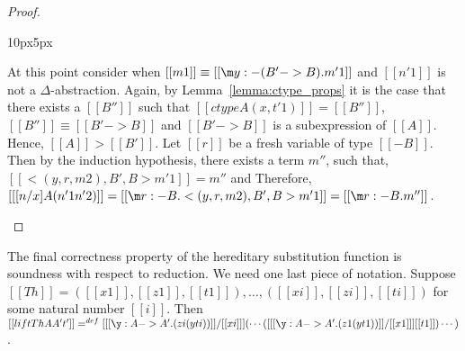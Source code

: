 \begin{proof}
\begin{changemargin}{10px}{5px}
\begin{itemize}
    At this point consider when $[[m1]] \equiv [[\m y:{-(B'->B)}.m'1]]$ and $[[n'1]]$ is not a 
    $\Delta$-abstraction.  Again, by Lemma~\ref{lemma:ctype_props} it is the case that 
    there exists a $[[B'']]$ such that $[[ctype A (x,t'1)]] = [[B'']]$, $[[B'']] \equiv [[B' -> B]]$ and
    $[[B' -> B]]$ is a subexpression of $[[A]]$.  Hence, $[[A]] > [[B']]$. Let $[[r]]$ be a fresh variable of type $[[{-B}]]$.    
    Then by the induction hypothesis, there exists a term $m''$, such that, $[[<(y,r,m2),B',B>m'1]] = m''$ and 
    Therefore, $[[ [n/x] A (n'1 n'2)]] = [[\m r:{-B}.<(y,r,m2),B',B>m'1]] = [[\m r:{-B}.m'']]$.
  \end{itemize}
  \end{changemargin}
\end{proof}
\noindent
The final correctness property of the hereditary substitution function is
soundness with respect to reduction.  We need one last piece of notation.
Suppose $[[Th]] = ([[x1]],[[z1]],[[t1]]),\ldots,([[xi]],[[zi]],[[ti]])$ for
some natural number $[[i]]$.
Then $[[lift Th A A' t']] =^{def} [ [[\y:A -> A'.(zi (y ti))]]/[[xi]] ](\cdots([ [[\y:A -> A'.(z1 (y t1))]]/[[x1]] ][[t1]])\cdots)$.


